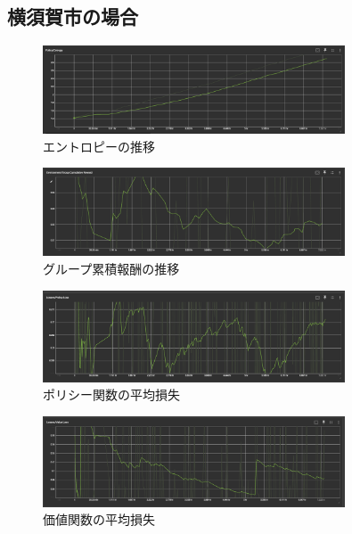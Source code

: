 \subsection{横須賀市の場合}
\begin{figure}[H] 
  \centering 
  \includegraphics[width=0.8\textwidth]{Figures/App-YokosukaSearchEntropy.png}
  \caption{エントロピーの推移} 
  \label{fig:fig-01}
\end{figure}
\begin{figure}[H] 
  \centering 
  \includegraphics[width=0.8\textwidth]{Figures/App-YokosukaSearchGroupRward.png}
  \caption{グループ累積報酬の推移} 
  \label{fig:fig-01}
\end{figure}
\begin{figure}[H] 
  \centering 
  \includegraphics[width=0.8\textwidth]{Figures/YokosukaSearch-PolicyLoss.png}
  \caption{ポリシー関数の平均損失} 
  \label{fig:fig-01}
\end{figure}
\begin{figure}[H] 
  \centering 
  \includegraphics[width=0.8\textwidth]{Figures/App-YokosukaSearchVlueLoss.png}
  \caption{価値関数の平均損失} 
  \label{fig:fig-01}
\end{figure}



